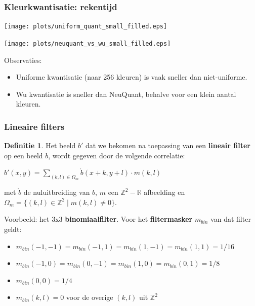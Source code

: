 \documentclass[dutch]{beamer}
\theoremstyle{definition}
\newtheorem{definitie}[theorem]{Definitie}
\theoremstyle{remark}
\theoremstyle{example}
\begin{document}
\frame
{
  \frametitle{Kleurkwantisatie: rekentijd}
  
  \begin{center}
  \begin{minipage}[t]{0.45\textwidth}
  \vspace{0pt}
  \centering
  \texttt{[image: plots/uniform\_quant\_small\_filled.eps]}
  \end{minipage}
  \begin{minipage}[t]{0.45\textwidth}
  \vspace{0pt}
  \centering
  \texttt{[image: plots/neuquant\_vs\_wu\_small\_filled.eps]}
  \end{minipage}
  \end{center}

  Observaties:
  \begin{itemize}
    \item Uniforme kwantisatie (naar 256 kleuren) is vaak sneller dan niet-uniforme.
    \item Wu kwantisatie is sneller dan NeuQuant, behalve voor een klein aantal kleuren.
  \end{itemize}
}
\frame
{
  \frametitle{Lineaire filters}

  \begin{definitie}
  Het beeld $b'$ dat we bekomen na toepassing van een \textbf{lineair filter} op 
  een beeld $b$, wordt gegeven door de volgende correlatie:
  \begin{minipage}{\textwidth}
  \vspace{5pt}
  \centering
  $b'(x,y) = \displaystyle \sum_{(k,l) \in \Omega_m} \mathring{b}(x+k,y+l) \cdot m(k,l)$
  \end{minipage}
  met $\mathring{b}$ de nuluitbreiding van $b$, $m$ een $\mathbb{Z}^2 - \mathbb{R}$ 
  afbeelding en $\Omega_m = \{ (k,l) \in \mathbb{Z}^2 \mid m(k,l) \ne 0 \}$.
  \end{definitie}
  Voorbeeld: het 3x3 \textbf{binomiaalfilter}.
  Voor het \textbf{filtermasker} $m_{bin}$ van dat filter geldt:
  \begin{itemize} 
    \item {\scriptsize $m_{bin}(-1,-1)=m_{bin}(-1,1)=m_{bin}(1,-1)=m_{bin}(1,1)=1/16$} 
    \item {\scriptsize $m_{bin}(-1,0)=m_{bin}(0,-1)=m_{bin}(1,0)=m_{bin}(0,1)=1/8$}
    \item {\scriptsize $m_{bin}(0,0)=1/4$}
    \item {\scriptsize $m_{bin}(k,l)=0$ voor de overige $(k,l)$ uit $\mathbb{Z}^2$}
  \end{itemize}
}
\end{document}
